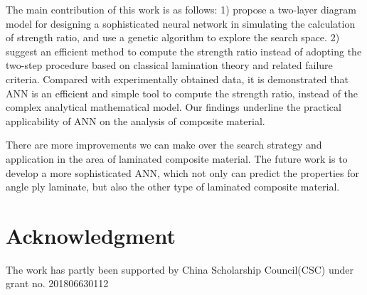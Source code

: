 \documentclass[letterpaper]{IEEEtran}
\begin{document}
The main contribution of this work is as follows: 1) propose a two-layer diagram
model for designing a sophisticated neural network in simulating the calculation
of strength ratio, and use a genetic algorithm to explore the search space. 2)
suggest an efficient method to compute the strength ratio instead of adopting
the two-step procedure based on classical lamination theory and related failure
criteria. Compared with experimentally obtained data, it is demonstrated that
ANN is an efficient and simple tool to compute the strength ratio, instead of
the complex analytical mathematical model. Our findings underline the practical
applicability of ANN on the analysis of composite material.

There are more improvements we can make over the search strategy and application
in the area of laminated composite material. The future work is to develop a
more sophisticated ANN, which not only can predict the properties for angle ply
laminate, but also the other type of laminated composite material.


\section*{Acknowledgment}
The work has partly been supported by China Scholarship
Council(CSC) under grant no. 201806630112

%




%
%

\end{document}
